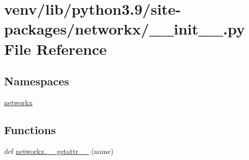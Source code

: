 \hypertarget{venv_2lib_2python3_89_2site-packages_2networkx_2____init_____8py}{}\section{venv/lib/python3.9/site-\/packages/networkx/\+\_\+\+\_\+init\+\_\+\+\_\+.py File Reference}
\label{venv_2lib_2python3_89_2site-packages_2networkx_2____init_____8py}
\subsection*{Namespaces}
\begin{DoxyCompactItemize}
\item 
 \hyperlink{namespacenetworkx}{networkx}
\end{DoxyCompactItemize}
\subsection*{Functions}
\begin{DoxyCompactItemize}
\item 
def \hyperlink{namespacenetworkx_a815450999704975ad1179cf0d86d7c75}{networkx.\+\_\+\+\_\+getattr\+\_\+\+\_\+} (name)
\end{DoxyCompactItemize}
